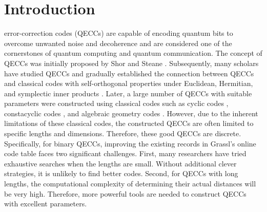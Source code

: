 \documentclass[journal]{IEEEtran}
\begin{document}
\section{Introduction}
 error-correction codes (QECCs) are capable of encoding quantum bits to overcome unwanted noise and decoherence and are considered one of the cornerstones of quantum computing and quantum communication. 
The concept of QECCs was initially proposed by Shor \cite{shors1995scheme} and Steane \cite{steane1996multiple}.
Subsequently, many scholars have studied QECCs and gradually established the connection between QECCs and classical codes with self-orthogonal properties under Euclidean, Hermitian, and symplectic inner products \cite{calderbank1998quantum,ketkar2006nonbinary,steane1999enlargement}.
Later, a large number of QECCs with suitable parameters were constructed using classical codes such as cyclic codes \cite{aly2007quantum,shi2019dual}, constacyclic codes \cite{kai2014constacyclic,chen2015application}, and algebraic geometry codes \cite{jin2011euclidean,bartoli2021certain}.
However, due to the inherent limitations of these classical codes, the constructed QECCs are often limited to specific lengths and dimensions. Therefore, these good QECCs are discrete.
Specifically, for binary QECCs, improving the existing records in Grassl's online code table \cite{Grassltable} faces two significant challenges. 
First, many researchers have tried exhaustive searches when the lengths are small. Without additional clever strategies, it is unlikely to find better codes. Second, for QECCs with long lengths, the computational complexity of determining their actual distances will be very high.
Therefore, more powerful tools are needed to construct QECCs with excellent parameters. 
\end{document}
